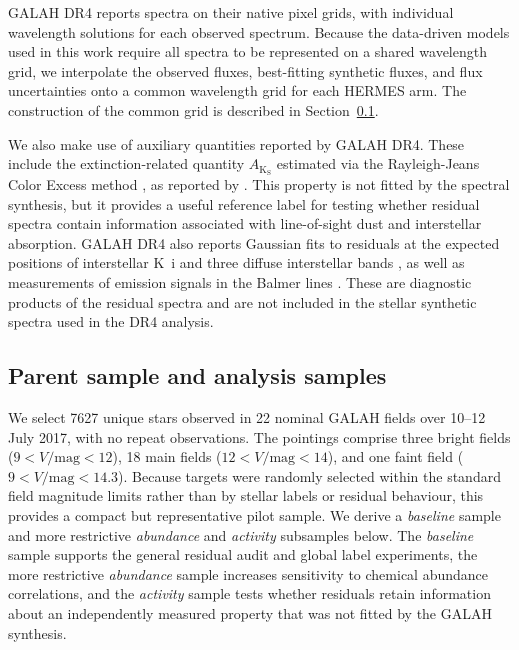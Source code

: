 \documentclass[twocolumn,apj,numberedappendix,appendixfloats]{openjournal}
\begin{document}
GALAH DR4 reports spectra on their native pixel grids, with individual wavelength solutions for each observed spectrum. Because the data-driven models used in this work require all spectra to be represented on a shared wavelength grid, we interpolate the observed fluxes, best-fitting synthetic fluxes, and flux uncertainties onto a common wavelength grid for each HERMES arm. The construction of the common grid is described in Section~\ref{sec:data_samples}.

We also make use of auxiliary quantities reported by GALAH DR4. These include the extinction-related quantity $A_\mathrm{K_S}$ estimated via the Rayleigh-Jeans Color Excess method \citep{Majewski2011}, as reported by \citet{Buder2025b}. This property is not fitted by the spectral synthesis, but it provides a useful reference label for testing whether residual spectra contain information associated with line-of-sight dust and interstellar absorption. GALAH DR4 also reports Gaussian fits to residuals at the expected positions of interstellar K~{\sc i} and three diffuse interstellar bands \citep[see Sec.~6.1.3][]{Buder2025b}, as well as measurements of emission signals in the Balmer lines \citep[see Sec.~6.1.4][]{Buder2025b}. These are diagnostic products of the residual spectra and are not included in the stellar synthetic spectra used in the DR4 analysis.

\subsection{Parent sample and analysis samples}
\label{sec:data_samples}

We select 7627 unique stars observed in 22 nominal GALAH fields over 10--12 July 2017, with no repeat observations. The pointings comprise 
three bright fields ($9<V/\mathrm{mag}<12$), %
18 main fields ($12<V/\mathrm{mag}<14$), and %
one faint field ($9<V/\mathrm{mag}<14.3$). %
Because targets were randomly selected within the standard field magnitude limits rather than by stellar labels or residual behaviour, this provides a compact but representative pilot sample. We derive a \textit{baseline} sample and more restrictive \textit{abundance} and \textit{activity} subsamples below. The \textit{baseline} sample supports the general residual audit and global label experiments, the more restrictive \textit{abundance} sample increases sensitivity to chemical abundance correlations, and the \textit{activity} sample tests whether residuals retain information about an independently measured property that was not fitted by the GALAH synthesis.
\end{document}
